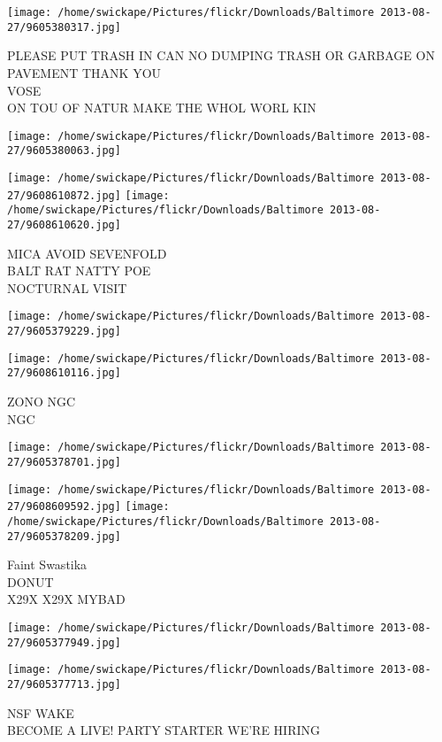\documentclass[10pt,letterpaper]{article}
\begin{document}
\texttt{[image: /home/swickape/Pictures/flickr/Downloads/Baltimore 2013-08-27/9605380317.jpg]}

PLEASE PUT TRASH IN CAN NO DUMPING TRASH OR GARBAGE ON PAVEMENT THANK YOU\\
VOSE\\
ON TOU OF NATUR MAKE THE WHOL WORL KIN
\pagebreak

\texttt{[image: /home/swickape/Pictures/flickr/Downloads/Baltimore 2013-08-27/9605380063.jpg]}

\vspace{0.25in}
\texttt{[image: /home/swickape/Pictures/flickr/Downloads/Baltimore 2013-08-27/9608610872.jpg]}
\texttt{[image: /home/swickape/Pictures/flickr/Downloads/Baltimore 2013-08-27/9608610620.jpg]}

MICA AVOID SEVENFOLD\\
BALT RAT NATTY POE\\
NOCTURNAL VISIT
\pagebreak

\texttt{[image: /home/swickape/Pictures/flickr/Downloads/Baltimore 2013-08-27/9605379229.jpg]}

\vspace{0.25in}
\texttt{[image: /home/swickape/Pictures/flickr/Downloads/Baltimore 2013-08-27/9608610116.jpg]}

ZONO NGC\\
NGC
\pagebreak

\texttt{[image: /home/swickape/Pictures/flickr/Downloads/Baltimore 2013-08-27/9605378701.jpg]}

\vspace{0.25in}
\texttt{[image: /home/swickape/Pictures/flickr/Downloads/Baltimore 2013-08-27/9608609592.jpg]}
\texttt{[image: /home/swickape/Pictures/flickr/Downloads/Baltimore 2013-08-27/9605378209.jpg]}

Faint Swastika\\
DONUT\\
X29X X29X MYBAD
\pagebreak

\texttt{[image: /home/swickape/Pictures/flickr/Downloads/Baltimore 2013-08-27/9605377949.jpg]}

\vspace{0.25in}
\texttt{[image: /home/swickape/Pictures/flickr/Downloads/Baltimore 2013-08-27/9605377713.jpg]}

NSF WAKE\\
BECOME A LIVE! PARTY STARTER WE'RE HIRING
\pagebreak
\end{document}
